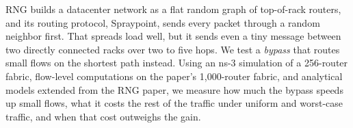 RNG builds a datacenter network as a flat random graph of top-of-rack routers, and its routing protocol, Spraypoint, sends every packet through a random neighbor first. That spreads load well, but it sends even a tiny message between two directly connected racks over two to five hops. We test a \emph{bypass} that routes small flows on the shortest path instead. Using an ns-3 simulation of a 256-router fabric, flow-level computations on the paper's 1{,}000-router fabric, and analytical models extended from the RNG paper, we measure how much the bypass speeds up small flows, what it costs the rest of the traffic under uniform and worst-case traffic, and when that cost outweighs the gain.

